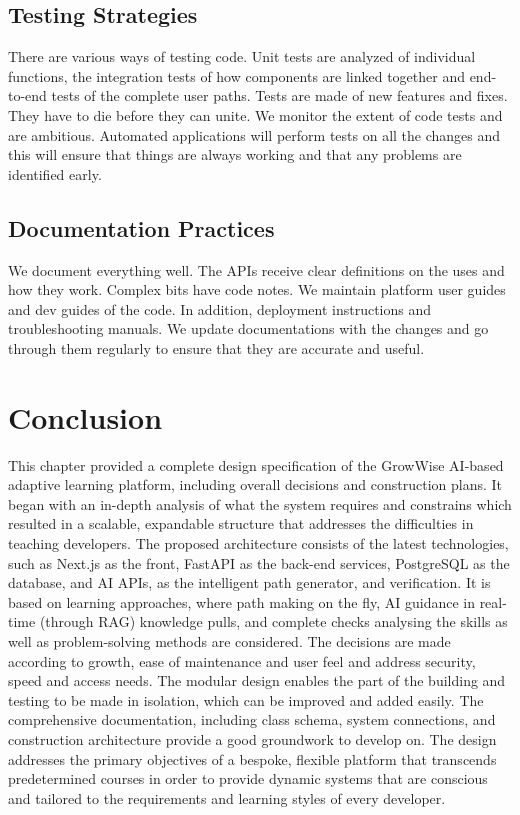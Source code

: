 \documentclass{FastFyp}
\begin{document}
\subsection{Testing Strategies}
There are various ways of testing code. Unit tests are analyzed of individual functions, the integration tests of how components are linked together and end-to-end tests of the complete user paths.
Tests are made of new features and fixes. They have to die before they can unite. We monitor the extent of code tests and are ambitious.
Automated applications will perform tests on all the changes and this will ensure that things are always working and that any problems are identified early.
\subsection{Documentation Practices}
We document everything well. The APIs receive clear definitions on the uses and how they work. Complex bits have code notes.
We maintain platform user guides and dev guides of the code. In addition, deployment instructions and troubleshooting manuals.
We update documentations with the changes and go through them regularly to ensure that they are accurate and useful.
\section{Conclusion}
This chapter provided a complete design specification of the GrowWise AI-based adaptive learning platform, including overall decisions and construction plans. It began with an in-depth analysis of what the system requires and constrains which resulted in a scalable, expandable structure that addresses the difficulties in teaching developers. The proposed architecture consists of the latest technologies, such as Next.js as the front, FastAPI as the back-end services, PostgreSQL as the database, and AI APIs, as the intelligent path generator, and verification. It is based on learning approaches, where path making on the fly, AI guidance in real-time (through RAG) knowledge pulls, and complete checks analysing the skills as well as problem-solving methods are considered. The decisions are made according to growth, ease of maintenance and user feel and address security, speed and access needs. The modular design enables the part of the building and testing to be made in isolation, which can be improved and added easily. The comprehensive documentation, including class schema, system connections, and construction architecture provide a good groundwork to develop on. The design addresses the primary objectives of a bespoke, flexible platform that transcends predetermined courses in order to provide dynamic systems that are conscious and tailored to the requirements and learning styles of every developer.
\end{document}
